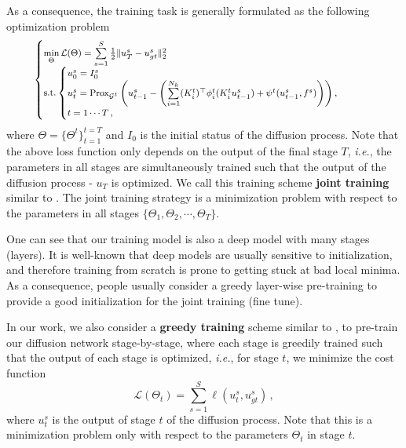 \documentclass[10pt,journal,compsoc]{IEEEtran}
\newcommand{\cG}{\mathcal{G}}
\newcommand{\cL}{\mathcal{L}}
\newcommand{\suml}[2]{\sum\limits_{#1}^{#2}}
\newcommand{\ie}{\emph{i.e.}}
\begin{document}
As a consequence, the training task is generally formulated as the following 
optimization problem
\begin{equation}\label{learning}
\footnotesize
\hspace{-0.5cm}\begin{cases}
\min\limits_{\Theta}\cL(\Theta) = \sum\limits_{s = 1}^{S}\frac 1 2
\|u_T^s - u_{gt}^s\|^2_2\\
\text{s.t.}
\begin{cases}
u_0^s = I_0^s \\
u_{t}^s = \text{Prox}_{\cG^t}\left(u_{t-1}^s - 
\left(\sum\limits_{i = 1}^{N_k}(K_i^t)^\top \phi_i^t(K_i^t u_{t-1}^s)
 + \psi^t(u_{t-1}^s, f^s)\right)\right), \\
t = 1 \cdots T\,,
\end{cases}
\end{cases}
\end{equation}
where $\Theta = \{\Theta^t\}_{t=1}^{t=T}$ and $I_0$ is the initial status of 
the diffusion process.
Note that the above loss function only depends on the output of the final 
stage $T$, \ie, the parameters in all stages are 
simultaneously trained such that the output of the diffusion process -  $u_T$ is optimized. {
We call this training scheme \textbf{joint training} similar to \cite{CSF2014}. }
The joint training strategy is a minimization problem with respect to 
the parameters in all stages $\{\Theta_1, \Theta_2, \cdots, \Theta_T\}$. 


One can see that our training model is also 
a deep model with many stages (layers). It is well-known that deep models are usually sensitive to initialization, 
and therefore training from scratch is prone to getting stuck at bad local minima. As a consequence, 
people usually consider a greedy layer-wise pre-training \cite{bengio2007greedy} to provide a good 
initialization for the joint training (fine tune). 

{
In our work, we also consider a \textbf{greedy training} scheme similar to 
\cite{CSF2014},} to pre-train our diffusion network stage-by-stage, where 
each stage is greedily trained such that the output of each stage is optimized, \ie, for stage $t$, we minimize the 
cost function
\begin{equation}\label{greedy}
\cL(\Theta_t ) = \suml{s = 1}{S}\ell(u_t^s, u_{gt}^s) \,,
\end{equation}
where $u_t^s$ is the output of stage $t$ of the diffusion process. Note that this is a minimization problem only 
with respect to the parameters $\Theta_t$ in stage $t$. 
\end{document}
